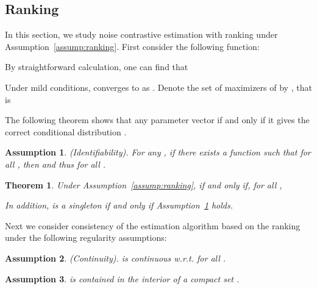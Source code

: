 \documentclass[11pt,a4paper]{article}
\newtheorem{theorem}{Theorem}[section]
\newtheorem{assumption}{Assumption}[section]
\newcommand{\commentout}[1]{}
\begin{document}
\commentout{
In practice,  is
unknown but can be substituted by its sample estimate, e.g. the
empirical distribution of . 
\commentout{
This paper focuses on the regime where
the sample size is large enough, to the extent that the conditional
distribution  can be well estimated, that is
. Under this condition, the
estimation of  is a second order issue compared with the
estimation of the scoring function . }
Technically, to
avoid this simplification, one can divide the training samples into
two parts, using the first part to construct an estimator of
, denoted by , and run the noise
contrastive estimation algorithm on the second part with
. This guarantees the negative
samples  drawn from
 and the training example  are
independent such that the asymptotic analysis in the proof will go
through.}

\subsection{Ranking}
\label{sec:ranking}
In this section, we study noise contrastive estimation with ranking  under Assumption~\ref{assump:ranking}. 
First consider the following function:

By straightforward calculation, one can find that 

Under mild conditions, 
converges to  as . 
Denote the set of maximizers of  by , that is 
 
The following theorem shows that any parameter vector  if and only if it gives the correct conditional distribution . 


\begin{assumption}
  (Identifiability). 
For any , if there exists a function
 such that 
for all , then  and thus 
 for all .
  \label{assump:identifiability-rank}
\end{assumption}

\begin{theorem} 
Under Assumption~\ref{assump:ranking},  if and only if, for all ,

In addition,  is a singleton if and only if Assumption~\ref{assump:identifiability-rank} holds. 
\label{thm:pop-consistency-rank}
\end{theorem}



Next we consider consistency of the estimation algorithm based on the 
ranking  under the following regularity assumptions:
\begin{assumption}
  (Continuity).  is continuous w.r.t.  for all .
  \label{assump:continuity}
\end{assumption}
\begin{assumption} 
 is contained in the interior of a compact set .
  \label{assump:compactness-rank}
\end{assumption}
\end{document}
